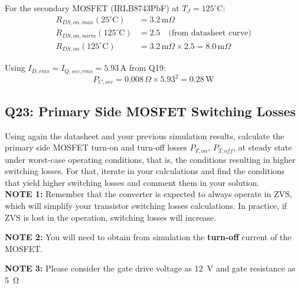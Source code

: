 \documentclass{PELsmallreport}
\begin{document}
\begin{framed}
	\vspace{2em}
  For the secondary MOSFET (IRLB8743PbF) at $T_J = 125^\circ$C:
\begin{align}
    R_{DS,on,max}(25^\circ\text{C}) &= 3.2\,\text{m}\Omega \\
    R_{DS,on,norm}(125^\circ\text{C}) &= 2.5 \quad\text{(from datasheet curve)} \\
    R_{DS,on}(125^\circ\text{C}) &= 3.2\,\text{m}\Omega \times 2.5 = 8.0\,\text{m}\Omega
\end{align}
 
Using $I_{D,rms} = I_{Q,sec,rms} = 5.93$\,A from Q19:
\begin{equation}
    P_{C,sec} = 0.008\,\Omega \times 5.93^2 = 0.28\,\text{W}
\end{equation}
  \vspace{2em}
\end{framed}

 \hfill{}

\subsection{Q23: Primary Side MOSFET Switching Losses} 
Using again the datasheet and your previous simulation results, calculate the primary side MOSFET turn-on and turn-off losses $P_{T,on}, \,P_{T,off}$, at steady state under worst-case operating conditions, that is, the conditions resulting in higher switching losses. For that, iterate in your calculations and find the conditions that yield higher switching losses and comment them in your solution. \\ 

\textbf{NOTE 1:} Remember that the converter is expected to always operate in ZVS, which will simplify your transistor switching losses calculations. In practice, if ZVS is lost in the operation, switching losses will increase.

\textbf{NOTE 2:} You will need to obtain from simulation the \textbf{turn-off} current of the MOSFET.

\textbf{NOTE 3:} Please consider the gate drive voltage as \SI{12}{\volt} and gate resistance as \SI{5}{\ohm} \\
\end{document}
